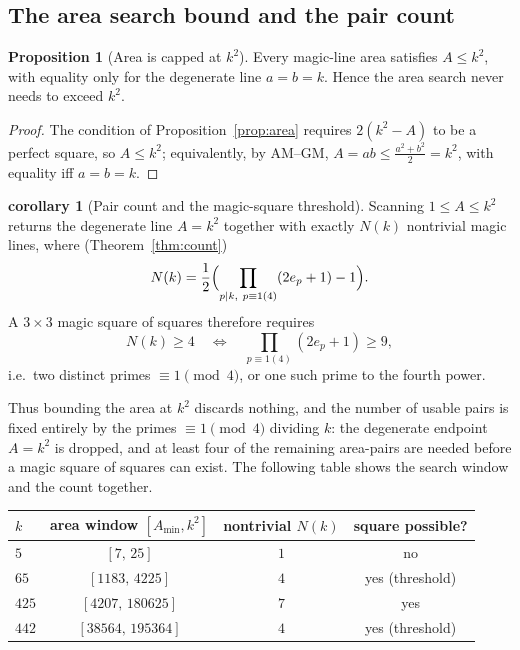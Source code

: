 \documentclass[11pt]{article}
\theoremstyle{definition}
\newtheorem{proposition}{Proposition}
\newtheorem{corollary}{corollary}
\begin{document}
\subsection{The area search bound and the pair count}

\begin{proposition}[Area is capped at $k^{2}$]\label{prop:areabound}
Every magic-line area satisfies $A\le k^{2}$, with equality only for the
degenerate line $a=b=k$. Hence the area search never needs to exceed $k^{2}$.
\end{proposition}

\begin{proof}
The condition of Proposition~\ref{prop:area} requires $2(k^{2}-A)$ to be a
perfect square, so $A\le k^{2}$; equivalently, by AM--GM,
$A=ab\le\tfrac{a^{2}+b^{2}}{2}=k^{2}$, with equality iff $a=b=k$.
\end{proof}

\begin{corollary}[Pair count and the magic-square threshold]\label{cor:paircount}
Scanning $1\le A\le k^{2}$ returns the degenerate line $A=k^{2}$ together with
exactly $N(k)$ nontrivial magic lines, where (Theorem~\ref{thm:count})
\[
  N(k)=\frac{1}{2}\Bigl(\prod_{p\mid k,\ p\equiv1(4)}(2e_{p}+1)-1\Bigr).
\]
A $3\times3$ magic square of squares therefore requires
\[
  N(k)\ge4 \quad\Longleftrightarrow\quad \prod_{p\equiv1(4)}(2e_{p}+1)\ge9,
\]
i.e.\ two distinct primes $\equiv1\pmod4$, or one such prime to the fourth power.
\end{corollary}

\noindent Thus bounding the area at $k^{2}$ discards nothing, and the number of
usable pairs is fixed entirely by the primes $\equiv1\pmod4$ dividing $k$: the
degenerate endpoint $A=k^{2}$ is dropped, and at least four of the remaining
area-pairs are needed before a magic square of squares can exist. The following
table shows the search window and the count together.

\begin{center}
\begin{tabular}{lccc}
\hline
$k$ & area window $[A_{\min},k^{2}]$ & nontrivial $N(k)$ & square possible?\\
\hline
$5$   & $[7,\,25]$          & $1$ & no\\
$65$  & $[1183,\,4225]$     & $4$ & yes (threshold)\\
$425$ & $[4207,\,180625]$   & $7$ & yes\\
$442$ & $[38564,\,195364]$  & $4$ & yes (threshold)\\
\hline
\end{tabular}
\end{center}
\end{document}
